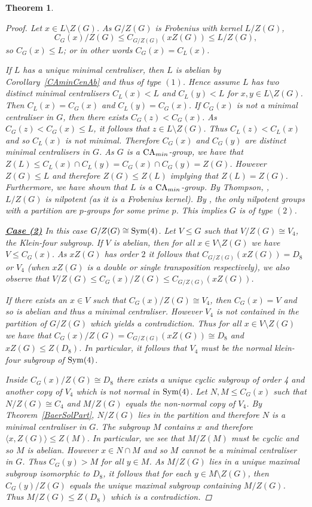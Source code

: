 \documentclass[a4paper,11pt]{article}
\theoremstyle{plain}
\newtheorem{thm}{Theorem}[section]
\numberwithin{thm}{section}
\begin{document}
\begin{thm}
\begin{proof}
Let $x\in L\setminus Z(G)$.
As $G/Z(G)$ is Frobenius with kernel $L/Z(G)$, 
\[
C_G(x)/Z(G)\leq C_{G/Z(G)}(xZ(G))\leq L/Z(G),
\]
so $C_G(x)\leq L$; or in other words $C_G(x)=C_L(x)$.


If $L$ has a unique minimal centraliser, then $L$ is abelian by Corollary~\ref{CAminCenAb} and thus of type $(1)$.
Hence assume $L$ has two distinct minimal centralisers $C_L(x)<L$ and $C_L(y)<L$ for $x,y\in L\setminus Z(G)$.
Then $C_L(x)=C_G(x)$ and $C_L(y)=C_G(x)$.
If $C_G(x)$ is not a minimal centraliser in $G$, then there exists $C_G(z)<C_G(x)$.
As $C_G(z)<C_G(x)\leq L$, it follows that $z\in L\setminus Z(G)$.
Thus $C_L(z)< C_L(x)$ and so $C_L(x)$ is not minimal.
Therefore $C_G(x)$ and $C_G(y)$ are distinct minimal centralisers in $G$.
As $G$ is a ${\rm CA}_{min}$-group, we have that $Z(L)\leq C_L(x)\cap C_L(y)=C_G(x)\cap C_G(y)=Z(G)$.
However $Z(G)\leq L$ and therefore $Z(G)\leq Z(L)$ implying that $Z(L)=Z(G)$.
Furthermore, we have shown that $L$ is a ${\rm CA}_{min}$-group.
By Thompson, \cite[Theorem V.8.7]{Huppert}, $L/Z(G)$ is nilpotent (as it is a Frobenius kernel).
By \cite[Remark 2.4]{BaerPart1}, the only nilpotent groups with a partition are $p$-groups for some prime $p$.
This implies $G$ is of type $(2)$.





\underline{\bf Case (2)}\newline
In this case $G/Z(G)\cong {\rm Sym}(4)$. 
Let $V\leq G$ such that $V/Z(G)\cong V_4$, the Klein-four subgroup.
If $V$ is abelian, then for all $x\in V\setminus Z(G)$ we have $V\leq C_G(x)$.
As $xZ(G)$ has order $2$ it follows that $C_{G/Z(G)}(xZ(G))=D_8$ or $V_4$ (when $xZ(G)$ is a double or single transposition respectively), we also observe that $V/Z(G)\leq C_G(x)/Z(G)\leq  C_{G/Z(G)}(xZ(G))$.

If there exists an $x\in V$ such that $C_G(x)/Z(G)\cong V_4$, then $C_G(x)=V$ and so is abelian and thus a minimal centraliser.
However $V_4$ is not contained in the partition of $G/Z(G)$ which yields a contradiction. 
Thus for all $x\in V\setminus Z(G)$ we have that $C_G(x)/Z(G)=C_{G/Z(G)}(xZ(G))\cong D_8$ and $xZ(G)\leq Z(D_8)$.
In particular, it follows that $V_4$ must be the normal klein-four subgroup of ${\rm Sym}(4)$.

Inside $C_G(x)/Z(G)\cong D_8$ there exists a unique cyclic subgroup of order 4 and another copy of $V_4$ which is not normal in ${\rm Sym}(4)$.
Let $N,M\leq C_G(x)$ such that $N/Z(G)\cong C_4$ and $M/Z(G)$ equals the non-normal copy of $V_4$.
By Theorem~\ref{BaerSolPart}, $N/Z(G)$ lies in the partition and therefore $N$ is a minimal centraliser in $G$.
The subgroup $M$ contains $x$ and therefore $\langle x,Z(G)\rangle \leq Z(M)$. 
In particular, we see that $M/Z(M)$ must be cyclic and so $M$ is abelian.
However $x\in N\cap M$ and so $M$ cannot be a minimal centraliser in $G$.
Thus $C_G(y)>M$ for all $y\in M$.
As $M/Z(G)$ lies in a unique maximal subgroup isomorphic to $D_8$, it follows that for each $y\in M\setminus Z(G)$, then $C_G(y)/Z(G)$ equals the unique maximal subgroup containing $M/Z(G)$.
Thus $M/Z(G)\leq Z(D_8)$ which is a contradiction.   



\end{proof}
\end{thm}
\end{document}
